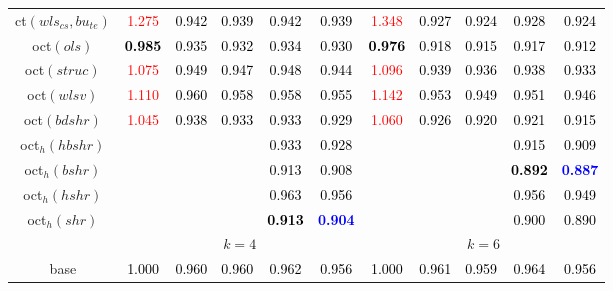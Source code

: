 \begin{tabular}[t]{c|>{}cccc>{}c|ccccc}
ct$(wls_{cs}, bu_{te})$ & \textcolor{red}{1.275} & \textcolor{black}{0.942} & \textcolor{black}{0.939} & \textcolor{black}{0.942} & \textcolor{black}{0.939} & \textcolor{red}{1.348} & \textcolor{black}{0.927} & \textcolor{black}{0.924} & \textcolor{black}{0.928} & \textcolor{black}{0.924}\\
oct$(ols)$ & \textcolor{black}{\textbf{0.985}} & \textcolor{black}{0.935} & \textcolor{black}{0.932} & \textcolor{black}{0.934} & \textcolor{black}{0.930} & \textcolor{black}{\textbf{0.976}} & \textcolor{black}{0.918} & \textcolor{black}{0.915} & \textcolor{black}{0.917} & \textcolor{black}{0.912}\\
oct$(struc)$ & \textcolor{red}{1.075} & \textcolor{black}{0.949} & \textcolor{black}{0.947} & \textcolor{black}{0.948} & \textcolor{black}{0.944} & \textcolor{red}{1.096} & \textcolor{black}{0.939} & \textcolor{black}{0.936} & \textcolor{black}{0.938} & \textcolor{black}{0.933}\\
oct$(wlsv)$ & \textcolor{red}{1.110} & \textcolor{black}{0.960} & \textcolor{black}{0.958} & \textcolor{black}{0.958} & \textcolor{black}{0.955} & \textcolor{red}{1.142} & \textcolor{black}{0.953} & \textcolor{black}{0.949} & \textcolor{black}{0.951} & \textcolor{black}{0.946}\\
oct$(bdshr)$ & \textcolor{red}{1.045} & \textcolor{black}{0.938} & \textcolor{black}{0.933} & \textcolor{black}{0.933} & \textcolor{black}{0.929} & \textcolor{red}{1.060} & \textcolor{black}{0.926} & \textcolor{black}{0.920} & \textcolor{black}{0.921} & \textcolor{black}{0.915}\\
oct$_h(hbshr)$ &  &  &  & \textcolor{black}{0.933} & \textcolor{black}{0.928} &  &  &  & \textcolor{black}{0.915} & \textcolor{black}{0.909}\\
oct$_h(bshr)$ &  &  &  & \textcolor{black}{0.913} & \textcolor{black}{0.908} &  &  &  & \textcolor{black}{\textbf{0.892}} & \textcolor{blue}{\textbf{0.887}}\\
oct$_h(hshr)$ &  &  &  & \textcolor{black}{0.963} & \textcolor{black}{0.956} &  &  &  & \textcolor{black}{0.956} & \textcolor{black}{0.949}\\
oct$_h(shr)$ &  &  &  & \textcolor{black}{\textbf{0.913}} & \textcolor{blue}{\textbf{0.904}} &  &  &  & \textcolor{black}{0.900} & \textcolor{black}{0.890}\\
\addlinespace[0.3em]
\multicolumn{1}{c}{} & \multicolumn{5}{c}{\textbf{$k = 4$}} & \multicolumn{5}{c}{\textbf{$k = 6$}}\\
base & \textcolor{black}{1.000} & \textcolor{black}{0.960} & \textcolor{black}{0.960} & \textcolor{black}{0.962} & \textcolor{black}{0.956} & \textcolor{black}{1.000} & \textcolor{black}{0.961} & \textcolor{black}{0.959} & \textcolor{black}{0.964} & \textcolor{black}{0.956}\\

\end{tabular}
